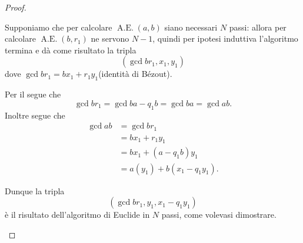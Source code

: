 \begin{proof}
\begin{description}
\begin{description}
            Supponiamo che per calcolare $\operatorname{A.E.}(a, b)$ siano necessari $N$ passi: allora per calcolare $\operatorname{A.E.}(b, r_1)$ ne servono $N-1$, quindi per ipotesi induttiva l'algoritmo termina e dà come risultato la tripla \[
                (\gcd{b}{r_1}, x_1, y_1) 
            \] dove $\gcd{b}{r_1} = bx_1 + r_1y_1$(identità di Bézout).

            Per il  segue che \[
                \gcd{b}{r_1} = \gcd{b}{a - q_1b} = \gcd{b}{a} = \gcd{a}{b}.
            \] Inoltre segue che \begin{align*}
                \gcd{a}{b} &= \gcd{b}{r_1} \\
                &= bx_1 + r_1y_1 \\
                &= bx_1 + (a - q_1b)y_1 \\
                &= a(y_1) + b(x_1 - q_1y_1).
            \end{align*}

            Dunque la tripla \[
                (\gcd{b}{r_1}, y_1, x_1 - q_1y_1)    
            \] è il risultato dell'algoritmo di Euclide in $N$ passi, come volevasi dimostrare. \qedhere
        \end{description} 
    \end{description}
\end{proof}